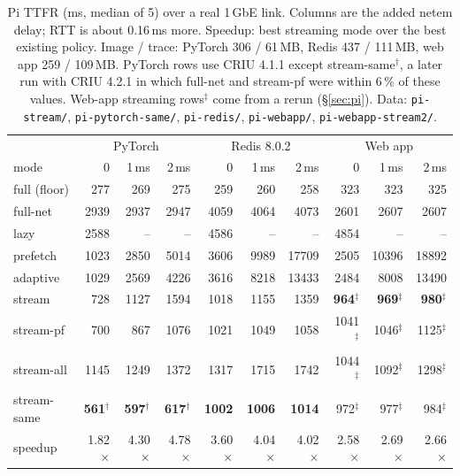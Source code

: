 \documentclass[conference]{IEEEtran}
\newcommand{\mode}[1]{\textsf{#1}}
\begin{document}
\begin{table}[t]
\centering
\caption{Pi TTFR (ms, median of 5) over a real 1\,GbE link. Columns are the
added netem delay; RTT is about 0.16\,ms more. Speedup: best streaming mode
over the best existing policy. Image / trace: PyTorch 306 / 61\,MB,
Redis 437 / 111\,MB, web app 259 / 109\,MB. PyTorch rows use CRIU 4.1.1 except
\mode{stream-same}$^\dagger$, a later run with CRIU 4.2.1 in which
\mode{full-net} and \mode{stream-pf} were within 6\,\% of these values.
Web-app streaming rows$^\ddagger$ come from a rerun (\S\ref{sec:pi}).
{Data: \texttt{pi-stream/}, \texttt{pi-pytorch-same/},
\texttt{pi-redis/}, \texttt{pi-webapp/}, \texttt{pi-webapp-stream2/}.}}
\label{tab:pi}
\setlength{\tabcolsep}{5pt}
\begin{tabular}{@{}l|rrr|rrr|rrr@{}}
\toprule
 & \multicolumn{3}{c|}{PyTorch} & \multicolumn{3}{c|}{Redis 8.0.2}
 & \multicolumn{3}{c}{Web app} \\
mode & 0 & 1\,ms & 2\,ms & 0 & 1\,ms & 2\,ms & 0 & 1\,ms & 2\,ms \\
\midrule
full (floor) & 277 & 269 & 275 & 259 & 260 & 258 & 323 & 323 & 325 \\
full-net & 2939 & 2937 & 2947 & 4059 & 4064 & 4073 & 2601 & 2607 & 2607 \\
lazy & 2588 & -- & -- & 4586 & -- & -- & 4854 & -- & -- \\
prefetch & 1023 & 2850 & 5014 & 3606 & 9989 & 17709 & 2505 & 10396 & 18892 \\
adaptive & 1029 & 2569 & 4226 & 3616 & 8218 & 13433 & 2484 & 8008 & 13490 \\
stream & 728 & 1127 & 1594 & 1018 & 1155 & 1359 & \textbf{964}$^\ddagger$ & \textbf{969}$^\ddagger$ & \textbf{980}$^\ddagger$ \\
stream-pf & 700 & 867 & 1076 & 1021 & 1049 & 1058 & 1041$^\ddagger$ & 1046$^\ddagger$ & 1125$^\ddagger$ \\
stream-all & 1145 & 1249 & 1372 & 1317 & 1715 & 1742 & 1044$^\ddagger$ & 1092$^\ddagger$ & 1298$^\ddagger$ \\
stream-same & \textbf{561}$^\dagger$ & \textbf{597}$^\dagger$ & \textbf{617}$^\dagger$ & \textbf{1002} & \textbf{1006} & \textbf{1014} & 972$^\ddagger$ & 977$^\ddagger$ & 984$^\ddagger$ \\
\midrule
speedup & 1.82$\times$ & 4.30$\times$ & 4.78$\times$ & 3.60$\times$ & 4.04$\times$ & 4.02$\times$ & 2.58$\times$ & 2.69$\times$ & 2.66$\times$ \\
\bottomrule
\end{tabular}
\end{table}
\end{document}
